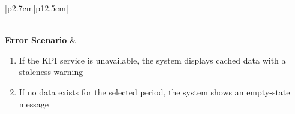 \begin{table}[H]
\begin{tabular}{|p{2.7cm}|p{12.5cm}|}
\begin{minipage}[t]{\linewidth}
                                  \end{minipage}                         \\
        \hline
        \textbf{Error Scenario} & \begin{minipage}[t]{\linewidth}
                                      \begin{enumerate}[topsep=0pt,itemsep=1pt,parsep=0pt,partopsep=0pt]
                                          \item If the KPI service is unavailable, the system displays cached data with a
                                                staleness warning
                                          \item If no data exists for the selected period, the system shows an empty-state
                                                message
                                      \end{enumerate}
                                  \end{minipage}                             \\
        \hline
    \end{tabular}
    \label{tab:admin-platform-kpis}
\end{table}

